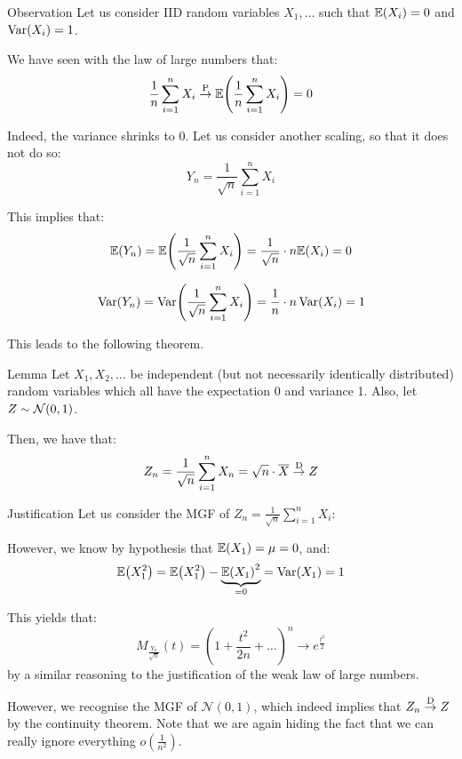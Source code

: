 \documentclass[a4paper]{article}
\begin{document}
\begin{parag}{Observation}
    Let us consider IID random variables $X_1, \ldots$ such that $\exval\left(X_i\right) = 0$ and $\Var\left(X_i\right) = 1$.

    We have seen with the law of large numbers that: 
    \[\frac{1}{n}\sum_{i=1}^{n} X_i \over{\to}{P} \exval\left(\frac{1}{n}\sum_{i=1}^{n} X_i\right) = 0\]
    
    Indeed, the variance shrinks to 0. Let us consider another scaling, so that it does not do so: 
    \[Y_n = \frac{1}{\sqrt{n}} \sum_{i=1}^{n} X_i\]
    
    This implies that:  
    \[\exval\left(Y_n\right) = \exval\left(\frac{1}{\sqrt{n}}\sum_{i=1}^{n} X_i\right) = \frac{1}{\sqrt{n}}\cdot n \exval\left(X_i\right) = 0\]
    
    \[\Var\left(Y_n\right) = \Var\left(\frac{1}{\sqrt{n}} \sum_{i=1}^{n} X_i\right) = \frac{1}{n} \cdot n\Var\left(X_i\right) = 1\]

    This leads to the following theorem.
\end{parag}

\begin{parag}{Lemma}
    Let $X_1, X_2, \ldots$ be independent (but not necessarily identically distributed) random variables which all have the expectation 0 and variance 1. Also, let $Z \followsdistr \mathcal{N}\left(0, 1\right)$.

    Then, we have that: 
    \[Z_n = \frac{1}{\sqrt{n}} \sum_{i=1}^{n} X_n = \sqrt{n}\cdot \bar{X} \over{\to}{D} Z\]
    
    \begin{subparag}{Justification}
        Let us consider the MGF of $Z_n = \frac{1}{\sqrt{n}}\sum_{i=1}^{n} X_i$: 

        However, we know by hypothesis that $\exval\left(X_1\right) = \mu = 0$, and:
        \[\exval\left(X_1^2\right) = \exval\left(X_1^2\right) - \underbrace{\exval\left(X_1\right)^2}_{= 0} = \Var\left(X_1\right) = 1\]

        This yields that:
        \[M_{\frac{Y_n}{\sqrt{n}}}\left(t\right) = \left(1 + \frac{t^2}{2n} + \ldots\right)^n \to e^{\frac{t^2}{2}}\]
        by a similar reasoning to the justification of the weak law of large numbers.
        
        However, we recognise the MGF of $\mathcal{N}\left(0, 1\right)$, which indeed implies that $Z_n \over{\to}{D} Z$ by the continuity theorem. Note that we are again hiding the fact that we can really ignore everything $o\left(\frac{1}{n^2}\right)$.
    \end{subparag}
\end{parag}
\end{document}
